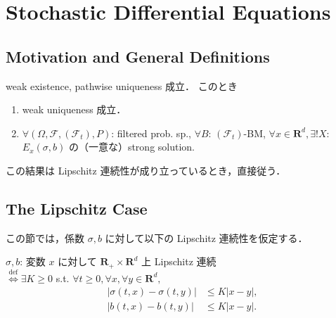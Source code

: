 \documentclass{jsarticle}
\title{}
\author{}
\date{
}
\begin{document}
\setcounter{section}{7}
\section{Stochastic Differential Equations}
\subsection{Motivation and General Definitions}

\begin{screen}
    \begin{thm*}
        weak existence, pathwise uniqueness 成立．
        このとき
        \begin{enumerate}[label=(\roman*)]
            \item
            weak uniqueness 成立．
            \item
            $\forall (\Omega, \mathcal{F}, (\mathcal{F}_t), P)$: filtered prob. sp., $\forall B$: $(\mathcal{F}_t)$-BM, $\forall x\in\mathbf{R}^d, \exists! X$: $E_x(\sigma, b)$ の（一意な）strong solution.
        \end{enumerate}
    \end{thm*}
\end{screen}

この結果は Lipschitz 連続性が成り立っているとき，直接従う．

\subsection{The Lipschitz Case}

この節では，係数 $\sigma, b$ に対して以下の Lipschitz 連続性を仮定する．

\begin{screen}
    \begin{df*}
    $\sigma, b$: 変数 $x$ に対して $\mathbf{R_+}\times\mathbf{R}^d$ 上 Lipschitz 連続 \\
        $\stackrel{\operatorname{def}}{\iff}\exists K\ge0$ s.t. $\forall t\ge0, \forall x, \forall y\in\mathbf{R}^d,$
        \begin{align}
            \left\lvert\sigma(t, x)-\sigma(t, y)\right\rvert
            &\le K\left\lvert x-y\right\rvert, \\
            \left\lvert b(t, x)-b(t, y)\right\rvert
            &\le K\left\lvert x-y\right\rvert.
        \end{align}
    \end{df*}
\end{screen}
\end{document}
